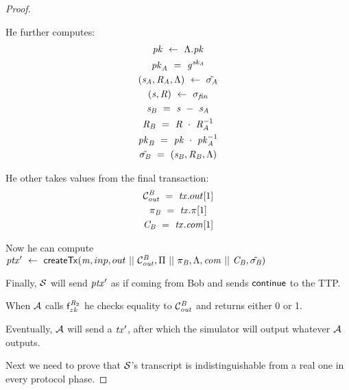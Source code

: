 \begin{proof}
\begin{asparaenum}
\begin{asparaenum}
            \item He further computes:
            \begin{gather*}
                \mathit{pk} ~\leftarrow~ \Lambda.\mathit{pk} \\
                \mathit{pk}_{\mathit{A}} ~=~ \mathit{g}^{\mathit{sk}_{\mathit{A}}} \\
                (\mathit{s}_{\mathit{A}}, \mathit{R}_{\mathit{A}}, \Lambda) ~\leftarrow~ \tilde{\sigma_{\mathit{A}}} \\
                (\mathit{s}, \mathit{R}) ~\leftarrow~ \sigma_{\mathit{fin}} \\
                \mathit{s}_{\mathit{B}} ~=~ \mathit{s} ~-~ \mathit{s}_{\mathit{A}} \\
                \mathit{R}_{\mathit{B}} ~=~ \mathit{R} ~\cdot~ \mathit{R}_{\mathit{A}}^{-1} \\
                \mathit{pk}_{\mathit{B}} ~=~ \mathit{pk} ~\cdot~ \mathit{pk}_{\mathit{A}}^{-1} \\
                \tilde{\sigma_{\mathit{B}}} ~=~ (\mathit{s}_{\mathit{B}}, \mathit{R}_{\mathit{B}}, \Lambda)
            \end{gather*}
            \item He other takes values from the final transaction:
            \begin{gather*}
                \mathcal{C}_{\mathit{out}}^{\mathit{B}} ~=~ \mathit{tx}.out[1] \\
                \pi_{\mathit{B}} ~=~ \mathit{tx}.\pi[1] \\
                \mathit{C}_{\mathit{B}} ~=~ \mathit{tx}.\mathit{com}[1]
            \end{gather*}
            \item Now he can compute ${\mathit{ptx}}' ~\leftarrow~ \mathsf{createTx}(\mathit{m},inp,out ~||~ \mathcal{C}_{\mathit{out}}^{\mathit{B}},\Pi ~||~ \pi_{\mathit{B}},\Lambda,\mathit{com} ~||~ \mathit{C}_{\mathit{B}},\tilde{\sigma_{\mathit{B}}})$
        \end{asparaenum}
        Finally, $\mathcal{S}$ will send ${\mathit{ptx}}'$ as if coming from Bob and sends $\mathsf{continue}$ to the TTP.
        \item When $\mathcal{A}$ calls $\mathsf{f}^{\mathit{R}_2}_{zk}$ he checks equality to $\mathcal{C}_{\mathit{out}}^{\mathit{B}}$ and returns either 0 or 1.
        \item Eventually, $\mathcal{A}$ will send a ${\mathit{tx}}'$, after which the simulator will output whatever $\mathcal{A}$ outputs.
    \end{asparaenum}
    Next we need to prove that $\mathcal{S}$'s transcript is indistinguishable from a real one in every protocol phase.

\end{proof}
